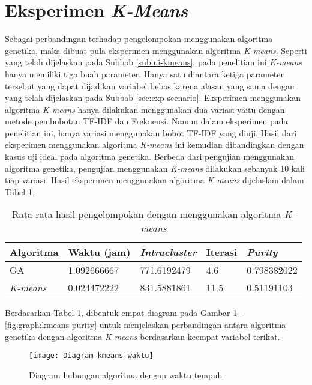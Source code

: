 \section{Eksperimen \textit{K-Means}}
Sebagai perbandingan terhadap pengelompokan menggunakan algoritma genetika, maka dibuat pula eksperimen menggunakan algoritma \textit{K-means}. Seperti yang telah dijelaskan pada Subbab \ref{sub:ui-kmeans}, pada penelitian ini \textit{K-means} hanya memiliki tiga buah parameter. Hanya satu diantara ketiga parameter tersebut yang dapat dijadikan variabel bebas karena alasan yang sama dengan yang telah dijelaskan pada Subbab \ref{sec:exp-scenario}. Eksperimen menggunakan algoritma \textit{K-means} hanya dilakukan menggunakan dua variasi yaitu dengan metode pembobotan TF-IDF dan Frekuensi. Namun dalam eksperimen pada penelitian ini, hanya variasi menggunakan bobot TF-IDF yang diuji. Hasil dari eksperimen menggunakan algoritma \textit{K-means} ini kemudian dibandingkan dengan kasus uji ideal pada algoritma genetika. Berbeda dari pengujian menggunakan algoritma genetika, pengujian menggunakan \textit{K-means} dilakukan sebanyak 10 kali tiap variasi. Hasil eksperimen menggunakan algoritma \textit{K-means} dijelaskan dalam Tabel \ref{tbl:exp-kmeans}.

\begin{table}[H]
	\centering
	\caption{Rata-rata hasil pengelompokan dengan menggunakan algoritma \textit{K-means}}
	\begin{tabular}{|l|l|l|l|l|} \hline
		Algoritma & Waktu (jam) & \textit{Intracluster} & Iterasi& \textit{Purity} \\ \hline
		GA      & 1.092666667 & 771.6192479 & 4.6  & 0.798382022 \\ \hline
		\textit{K-means} & 0.024472222 & 831.5881861 & 11.5 & 0.51191103 \\ \hline
	\end{tabular}
	\label{tbl:exp-kmeans}
\end{table}

Berdasarkan Tabel \ref{tbl:exp-kmeans}, dibentuk empat diagram pada Gambar \ref{fig:graph:kmeans-time} - \ref{fig:graph:kmeans-purity} untuk menjelaskan perbandingan antara algoritma genetika dengan algoritma \textit{K-means} berdasarkan keempat variabel terikat.

\begin{figure}[H]
	\centering
	\texttt{[image: Diagram-kmeans-waktu]}
	\caption{Diagram hubungan algoritma dengan waktu tempuh}
	\label{fig:graph:kmeans-time}
\end{figure}

